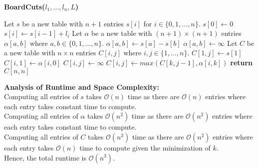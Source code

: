 \documentclass[12pt]{article}
\begin{document}
\begin{algorithm}[hbt!]
\caption{\textbf{BoardCuts($l_1,...,l_n,L$)}}\label{alg:cap}

\begin{algorithmic}[1]
\State Let $s$ be a new table with $n+1$ entries $s[i]$ for $i \in \{0,1,...,n\}$.
\State $s[0] \gets 0$
    \State $s[i] \gets s[i-1] + l_i$
\EndFor
\State
\State Let $\alpha$ be a new table with $(n+1) \times (n+1)$ entries $\alpha[a,b]$ where $a,b \in \{0,1,...,n\}$. 
         
            \State $\alpha[a,b] \gets s[a] - s[b]$
        \Else
            \State $\alpha[a,b] \gets \infty$
        \EndIf
    \EndFor
\EndFor
\State
\State Let $C$ be a new table with $n \times n$ entries $C[i,j]$ where $i,j \in \{1,...,n\}$. 
 
    \State $C[1,j] \gets s[1]$
\EndFor
\State
{} 
    \State $C[i,1] \gets \alpha[i,0]$
\EndFor
\State
{} 
        \State $C[i,j] \gets \infty$
                \State $C[i,j] \gets max(C[k,j-1], \alpha[i,k])$
            \EndIf
        \EndFor
    \EndFor
\EndFor
\State
\State \textbf{return} $C[n,n]$
\end{algorithmic}
\end{algorithm}

\newpage

\textbf{Analysis of Runtime and Space Complexity:} \\

Computing all entries of $s$ takes $\mathcal{O}(n)$ time as there are $\mathcal{O}(n)$ entries where each entry takes constant time to compute. \\

Computing all entries of $\alpha$ takes $\mathcal{O}(n^2)$ time as there are $\mathcal{O}(n^2)$ entries where each entry takes constant time to compute. \\

Computing all entries of $C$ takes $\mathcal{O}(n^3)$ time as there are $\mathcal{O}(n^2)$ entries where each entry takes $\mathcal{O}(n)$ time to compute given the minimization of $k$. \\

Hence, the total runtime is $\mathcal{O}(n^3)$. \\
\end{document}
